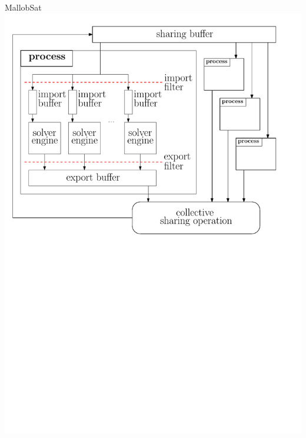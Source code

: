 \documentclass{beamer}
\begin{document}
\begin{frame}{MallobSat}
    \center
    \includegraphics[scale=.45]{figures/mallob_architecture.pdf}
\end{frame}
\end{document}
